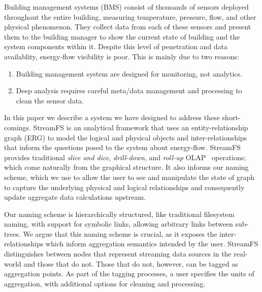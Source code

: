 Building management systems (BMS) consist of thousands of sensors
deployed throughout the entire building, measuring temperature, pressure, flow, and other physical phenomenon.
They collect data from each of these sensors and present them to the building manager to show the current
state of building and the system components within it. 
Despite this level of penetration and data availablity, energy-flow visibility is poor. 
This is mainly due to two reasons:

\begin{enumerate}
\item Building management system are designed for monitoring, not analytics.
\item Deep analysis requires careful meta/data management and processing to clean the sensor data.
\end{enumerate}
\vspace{0.08in}

In this paper we describe a system we have designed to address these short-comings.  StreamFS is an
analytical framework that uses an entity-relationship graph (ERG) to model the logical and physical objects and 
inter-relationships that inform the questions posed to the system about energy-flow.
StreamFS provides traditional \emph{slice and dice}, \emph{drill-down}, and \emph{roll-up} OLAP~\cite{olap} 
operations; which come naturally from the graphical structure.  It also informs 
our naming scheme, which we use to allow the user to see and manipulate the state of graph
to capture the underlying physical and logical relationships and consequently update aggregate
data calculations upstream.





Our naming scheme is hierarchically structured, like traditional filesystem naming, with support
for symbolic links, allowing arbitrary links between sub-trees.  We argue that this naming scheme
is crucial, as it exposes the inter-relationships which inform aggregation semantics intended
by the user.  StreamFS distinguishes between nodes that represent streaming data sources in the real-world
and those that do not.  Those that do not, however, can be tagged as aggregation points.  As part of the 
tagging processes, a user specifies the units of aggregation, with additional options for cleaning
and processing.

